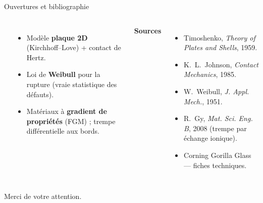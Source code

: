 \documentclass[11pt,aspectratio=169]{beamer}
\begin{document}
\begin{frame}{Ouvertures et bibliographie}
  \begin{columns}[T]
    \textbf{ }
    \footnotesize
    \begin{itemize}
      \item Modèle \textbf{plaque 2D} (Kirchhoff--Love) + contact de Hertz.
      \item Loi de \textbf{Weibull} pour la rupture (vraie statistique des
            défauts).
      \item Matériaux à \textbf{gradient de propriétés} (FGM) ;
            trempe différentielle aux bords.
    \end{itemize}
    \textbf{Sources}
    \scriptsize
    \begin{itemize}
      \item Timoshenko, \textit{Theory of Plates and Shells}, 1959.
      \item K.~L.~Johnson, \textit{Contact Mechanics}, 1985.
      \item W.~Weibull, \textit{J. Appl. Mech.}, 1951.
      \item R.~Gy, \textit{Mat. Sci. Eng. B}, 2008 (trempe par échange ionique).
      \item Corning Gorilla Glass --- fiches techniques.
    \end{itemize}
  \end{columns}
  \vspace{0.6cm}
  \begin{center}\Large\textcolor{verre}{Merci de votre attention.}\end{center}
\end{frame}
\end{document}

